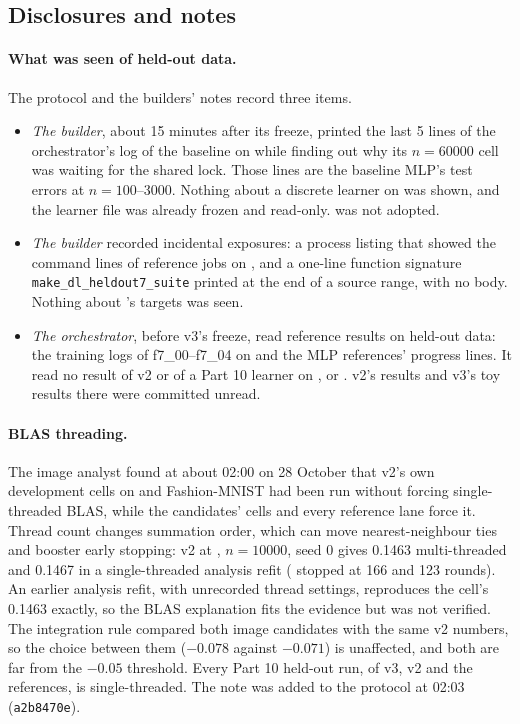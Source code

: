 \subsection{Disclosures and notes}\label{sec:disc-provenance-disclosures}

\paragraph{What was seen of held-out data.} The protocol and the builders' notes record three items.
\begin{itemize}
\item \emph{The  builder}, about 15 minutes after its freeze, printed the last 5 lines of the orchestrator's log of the baseline  on  while finding out why its $n=60000$ cell was waiting for the shared lock. Those lines are the baseline MLP's  test errors at $n=100$--3000. Nothing about a discrete learner on  was shown, and the learner file was already frozen and read-only.  was not adopted.
\item \emph{The  builder} recorded incidental exposures: a process listing that showed the command lines of reference jobs on , and a one-line function signature \texttt{make\_dl\_heldout7\_suite} printed at the end of a source range, with no body. Nothing about 's targets was seen.
\item \emph{The orchestrator}, before v3's freeze, read reference results on held-out data: the  training logs of f7\_00--f7\_04 on  and the MLP references'  progress lines. It read no result of v2 or of a Part 10 learner on ,  or . v2's  results and v3's toy results there were committed unread.
\end{itemize}

\paragraph{BLAS threading.} The image analyst found at about 02:00 on 28 October that v2's own development cells on  and Fashion-MNIST had been run without forcing single-threaded BLAS, while the candidates' cells and every reference lane force it. Thread count changes summation order, which can move nearest-neighbour ties and booster early stopping: v2 at , $n=10000$, seed 0 gives 0.1463 multi-threaded and 0.1467 in a single-threaded analysis refit ( stopped at 166 and 123 rounds). An earlier analysis refit, with unrecorded thread settings, reproduces the cell's 0.1463 exactly, so the BLAS explanation fits the evidence but was not verified. The integration rule compared both image candidates with the same v2 numbers, so the choice between them ($-0.078$ against $-0.071$) is unaffected, and both are far from the $-0.05$ threshold. Every Part 10 held-out run, of v3, v2 and the references, is single-threaded. The note was added to the protocol at 02:03 (\texttt{a2b8470e}).

